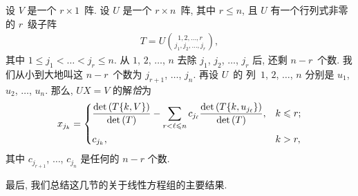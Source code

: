 \begin{theorem}
    设 \(V\) 是一个 \(r \times 1\)~阵.
    设 \(U\) 是一个 \(r \times n\)~阵,
    其中 \(r \leq n\),
    且 \(U\) 有一个行列式非零的 \(r\)~级子阵
    \begin{align*}
        T = U\binom{1,2,\dots,r}{j_1,j_2,\dots,j_r},
    \end{align*}
    其中 \(1 \leq j_1 < \dots < j_r \leq n\).
    从 \(1\), \(2\), \(\dots\), \(n\)
    去除 \(j_1\), \(j_2\), \(\dots\), \(j_r\)
    后, 还剩 \(n - r\)~个数.
    我们从小到大地叫这 \(n - r\)~个数为
    \(j_{r+1}\), \(\dots\), \(j_n\).
    再设 \(U\)~的%
    列~\(1\), \(2\), \(\dots\), \(n\)
    分别是 \(u_1\), \(u_2\), \(\dots\), \(u_n\).
    那么, \(UX = V\) 的解\emph{恰}为
    \begin{align*}
        x_{j_k}
        = \begin{dcases}
              \frac{\det {(T\{k,V\})}}{\det {(T)}}
              - \sum_{r < \ell \leq n}
              {c_{j_\ell}
              \frac{\det {(T\{k,u_{j_\ell}\})}}{\det {(T)}}},
               & k \leq r; \\
              c_{j_k},
               & k > r,
          \end{dcases}
    \end{align*}
    其中 \(c_{j_{r+1}}\), \(\dots\), \(c_{j_n}\)
    是任何的 \(n-r\) 个数.
\end{theorem}

最后, 我们总结这几节的关于线性方程组的主要结果.

